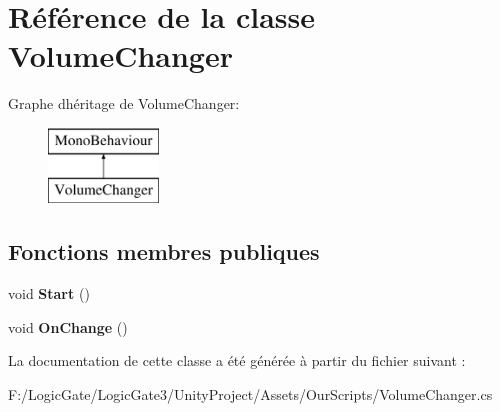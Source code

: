 \hypertarget{class_volume_changer}{}\section{Référence de la classe Volume\+Changer}
\label{class_volume_changer}
Graphe d\textquotesingle{}héritage de Volume\+Changer\+:\begin{figure}[H]
\begin{center}
\leavevmode
\includegraphics[height=2.000000cm]{class_volume_changer}
\end{center}
\end{figure}
\subsection*{Fonctions membres publiques}
\begin{DoxyCompactItemize}
\item 
\mbox{\label{class_volume_changer_a81d7924b367866554520282ca2c238c4}} 
void {\bfseries Start} ()
\item 
\mbox{\label{class_volume_changer_a2d5a85ac1481f094c08eb83cbadda336}} 
void {\bfseries On\+Change} ()
\end{DoxyCompactItemize}


La documentation de cette classe a été générée à partir du fichier suivant \+:\begin{DoxyCompactItemize}
\item 
F\+:/\+Logic\+Gate/\+Logic\+Gate3/\+Unity\+Project/\+Assets/\+Our\+Scripts/Volume\+Changer.\+cs\end{DoxyCompactItemize}
